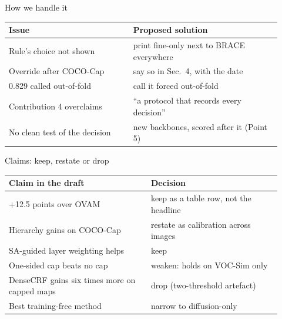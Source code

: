 \documentclass[aspectratio=169,11pt]{beamer}
\begin{document}
\begin{frame}{How we handle it}
\begin{slidetable}
\begin{tabular}{@{}L{0.42\linewidth}L{0.50\linewidth}@{}}
\toprule
Issue & Proposed solution \\
\midrule
Rule's choice not shown & print fine-only next to BRACE everywhere \\
Override after COCO-Cap & say so in Sec.~4, with the date \\
0.829 called out-of-fold & call it forced out-of-fold \\
Contribution 4 overclaims & ``a protocol that records every decision'' \\
No clean test of the decision & new backbones, scored after it (Point 5) \\
\bottomrule
\end{tabular}
\end{slidetable}
\end{frame}

\begin{frame}{Claims: keep, restate or drop}
\begin{slidetable}
\begin{tabular}{@{}L{0.48\linewidth}L{0.44\linewidth}@{}}
\toprule
Claim in the draft & Decision \\
\midrule
+12.5 points over OVAM & keep as a table row, not the headline \\
Hierarchy gains on COCO-Cap & restate as calibration across images \\
SA-guided layer weighting helps & keep \\
One-sided cap beats no cap & weaken: holds on VOC-Sim only \\
DenseCRF gains six times more on capped maps & drop (two-threshold artefact) \\
Best training-free method & narrow to diffusion-only \\
\bottomrule
\end{tabular}
\end{slidetable}
\end{frame}
\end{document}
